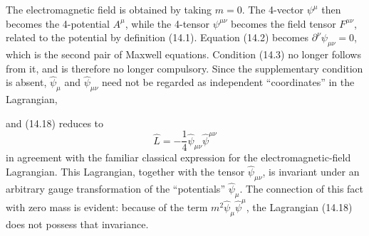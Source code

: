 The electromagnetic field is obtained by taking $m=0$. The 4-vector $\psi^\mu$ then becomes the 4-potential $A^\mu$, while the 4-tensor $\psi^{\mu\nu}$ becomes the field tensor $F^{\mu\nu}$, related to the potential by definition (14.1). Equation (14.2) becomes $\partial^\nu\psi_{\mu\nu}=0$, which is the second pair of Maxwell equations. Condition (14.3) no longer follows from it, and is therefore no longer compulsory. Since the supplementary condition is absent, $\widehat\psi_\mu$ and $\widehat\psi_{\mu\nu}$ need not be regarded as independent ``coordinates'' in the Lagrangian,

and (14.18) reduces to
\begin{equation}
\widehat L=-\frac14\widehat\psi_{\mu\nu}\widehat\psi^{\mu\nu}
\tag{14.19}
\end{equation}
in agreement with the familiar classical expression for the electromagnetic-field Lagrangian. This Lagrangian, together with the tensor $\widehat\psi_{\mu\nu}$, is invariant under an arbitrary gauge transformation of the ``potentials'' $\widehat\psi_\mu$. The connection of this fact with zero mass is evident: because of the term $m^2\widehat\psi_\mu\widehat\psi^\mu$, the Lagrangian (14.18) does not possess that invariance.
